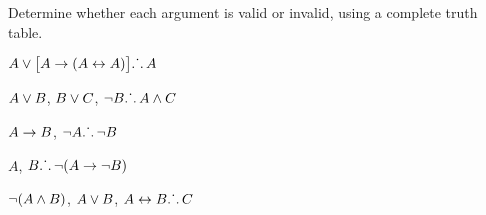 \documentclass[PHIL101-Textbook.tex]{subfiles}
\begin{document}
\pagebreak
\noindent\problempart
\label{pr.TT.valid3}
Determine whether each argument is valid or invalid, using a complete truth table. 
\begin{earg}
\item $A\vee\bigl[A\rightarrow(A\leftrightarrow A)\bigr] \ldotp\dot{}\,\ldotp  A $\vspace{.5ex}%
\item $A\vee B$, $B\vee C$, $\neg B \ldotp\dot{}\,\ldotp A \land C$\vspace{.5ex} %
\item $A \rightarrow B$, $\neg A\ldotp\dot{}\,\ldotp \neg B$ \vspace{.5ex}%
\item $A$, $B\ldotp\dot{}\,\ldotp \neg(A\rightarrow \neg B)$ \vspace{.5ex}%
\item $\neg(A \land B)$, $A \vee B$, $A \leftrightarrow B\ldotp\dot{}\,\ldotp C$ \vspace{.5ex}%
\end{earg}
\end{document}
